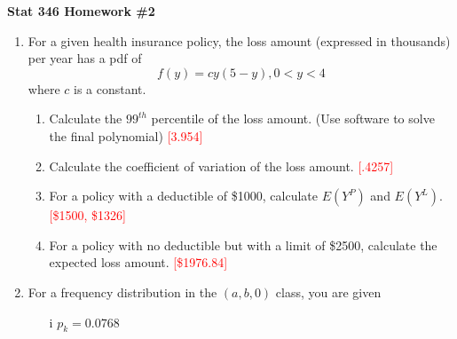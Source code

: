 \documentclass{article}
\begin{document}
\begin{center}
\textbf{Stat 346 Homework \#2}\\
\vspace{0.3in}
\end{center}
\begin{enumerate}
\item
 For a given health insurance policy, the loss amount (expressed in thousands) per year has a pdf of
    \[f(y) = cy(5-y), 0 < y < 4\]
    where $c$ is a constant.
    \begin{enumerate}
        \item Calculate the $99^{th}$ percentile of the loss amount. (Use software to solve the final polynomial) \textcolor{red}{[3.954]}
        \item Calculate the coefficient of variation of the loss amount. \textcolor{red}{[.4257]}
        \item For a policy with a deductible of \$1000, calculate $E(Y^P)$ and $E(Y^L)$. \textcolor{red}{[\$1500, \$1326]}
        \item For a policy with no deductible but with a limit of \$2500, calculate the expected loss amount. \textcolor{red}{[\$1976.84]}
    \end{enumerate}
\item
For a frequency distribution in the $(a,b,0)$ class, you are given
	\begin{enumerate} 
	\item[i] $p_{k}=0.0768$

\end{enumerate}
\end{enumerate}
\end{document}
